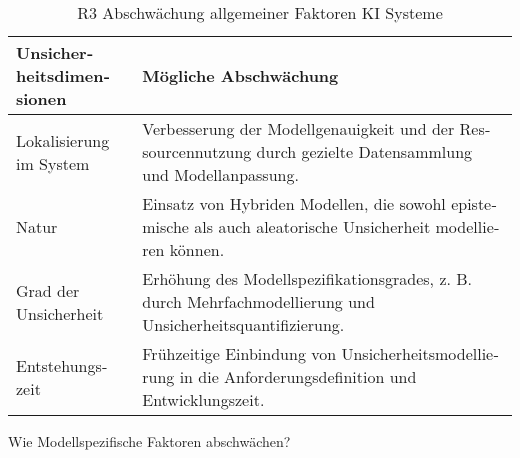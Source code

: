\begin{otherlanguage}{ngerman}
\begin{table}[!htpb]
  \centering
  \begin{tabularx}{\textwidth}{|l|X|}
    \hline
    \textbf{Unsicherheitsdimensionen} & \textbf{Mögliche Abschwächung} \\
    \hline
    Lokalisierung im System & Verbesserung der Modellgenauigkeit und der Ressourcennutzung durch gezielte Datensammlung und Modellanpassung. \\
    \hline
    Natur & Einsatz von Hybriden Modellen, die sowohl epistemische als auch aleatorische Unsicherheit modellieren können. \\
    \hline
    Grad der Unsicherheit & Erhöhung des Modellspezifikationsgrades, z. B. durch Mehrfachmodellierung und Unsicherheitsquantifizierung. \\
    \hline
    Entstehungszeit & Frühzeitige Einbindung von Unsicherheitsmodellierung in die Anforderungsdefinition und Entwicklungszeit. \\
    \hline
  \end{tabularx}
  \caption{R3 Abschwächung allgemeiner Faktoren KI Systeme}\label{tab:chapter6r31}
\end{table}

\newline
Wie Modellspezifische Faktoren abschwächen?


\end{otherlanguage}
